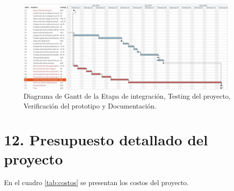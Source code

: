 \documentclass[
11pt, %
]{charter}
\begin{document}
\begin{figure}[htpb]
\centering 
\includegraphics[width=0.98\textwidth, height=.43 \textwidth]{./Figuras/ganttProyecto3.pdf}
\caption{Diagrama de Gantt de la Etapa de integración, Testing del proyecto, Verificación del prototipo y Documentación.}
\label{fig:gantt3}
\end{figure}



\section{12. Presupuesto detallado del proyecto}
\label{sec:presupuesto}



En el cuadro \ref{tab:costos} se presentan los costos del proyecto. 
\end{document}
